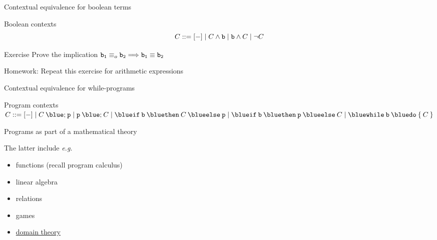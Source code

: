 \documentclass{beamer}
\begin{document}
\begin{frame}{Contextual equivalence for boolean terms}

        \begin{block}{Boolean contexts}
        \[
                C ::= [-] \mid C \wedge \mathtt{b} \mid \mathtt{b} \wedge C \mid \neg C
        \]
        \end{block} 

        \bigskip
        \begin{block}{Exercise}
                Prove the implication $\mathtt{b_1} \equiv_o \mathtt{b_2} 
                \Longrightarrow \mathtt{b_1} \equiv \mathtt{b_2}$
        \end{block}

        \pause
        \vfill
        Homework: Repeat this exercise for arithmetic expressions
\end{frame}

\begin{frame}{Contextual equivalence for while-programs}

        \begin{block}{Program contexts}
                \small{
                $C ::= [-] \mid C \> \prog{\blue ;} \> \prog{p} 
                \mid \prog{p} \> \prog{\blue ;} \> C \mid
                \mathtt{{\blue if} \> b \> {\blue then} \>} C \mathtt{\> {\blue else} \> p} 
                \mid
                \mathtt{{\blue if} \> b \> {\blue then} \> p \> {\blue else} \>} C 
                \mid 
                \mathtt{{\blue while} \> b \> {\blue do} \> \{ \>} C \mathtt{\> \}}$
        }
        \end{block} 

        \vfill
        \pause
        \centering
\end{frame}

\begin{frame}{Programs as part of a mathematical theory}
        
        \begin{center}
         \hspace{0.5cm} \scalebox{1.5}{${\hookrightarrow}$} 
        \hspace{0.5cm} 
        \end{center}

        The latter include \emph{e.g.}
        \begin{itemize}
                \item functions (recall program calculus)
                \item linear algebra
                \item relations
                \item games
                \item \alert{\underline{domain theory}}
        \end{itemize}
\end{frame}
\end{document}
